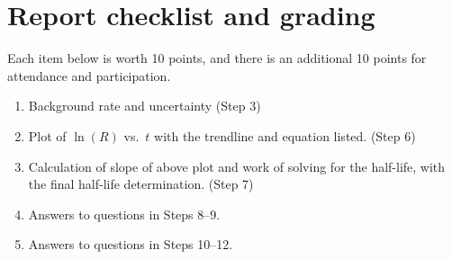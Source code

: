 \section{Report checklist and grading}

Each item below is worth 10 points, and there is an additional 10 points for attendance and participation.

\begin{enumerate}
	\item Background rate and uncertainty (Step 3)
	
	\item Plot of $\ln(R)$ vs.\ $t$ with the trendline and equation listed. (Step 6)
	
	\item Calculation of slope of above plot and work of solving for the half-life, with the final half-life determination. (Step 7)
	
	\item Answers to questions in Steps 8--9.
	
	\item Answers to questions in Steps 10--12.
\end{enumerate}